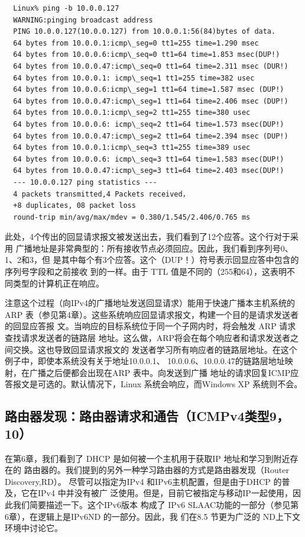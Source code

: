 \begin{verbatim}
  Linux% ping -b 10.0.0.127
  WARNING:pinging broadcast address
  PING 10.0.0.127(10.0.0.127) from 10.0.0.1:56(84)bytes of data.
  64 bytes from 10.0.0.1:icmp\_seg=0 tt1=255 time=1.290 msec
  64 bytes from 10.0.0.6:icmp\_seq=0 tt1=64 time=1.853 msec(DUP!)
  64 bytes from 10.0.0.47:icmp\_seq=0 tt1=64 time=2.311 msec (DUR!)
  64 bytes from 10.0.0.1: icmp\_seq=1 tt1=255 time=382 usec
  64 bytes from 10.0.0.6:icmp\_seg=1 tt1=64 time=1.587 msec (DUP!)
  64 bytes from 10.0.0.47:icmp\_seg=1 tt1=64 time=2.406 msec (DUP!)
  64 bytes from 10.0.0.1:icmp\_seg=2 tt1=255 time=380 usec
  64 bytes from 10.0.0.6: icmp\_seq=2 tt1=64 time=1.573 msec(DUP!)
  64 bytes from 10.0.0.47:icmp\_seg=2 tt1=64 time=2.394 msec (DUP!)
  64 bytes from 10.0.0.1:icmp\_seq=3 tt1=255 time=389 usec
  64 bytes from 10.0.0.6: icmp\_seq=3 tt1=64 time=1.583 msec(DUP!)
  64 bytes from 10.0.0.47:icmp\_seg=3 tt1=64 time=2.403 msec(DUP!)
  --- 10.0.0.127 ping statistics ---
  4 packets transmitted,4 Packets received，
  +8 duplicates, 08 packet loss
  round-trip min/avg/max/mdev = 0.380/1.545/2.406/0.765 ms
\end{verbatim}

此处，4个传出的回显请求报文被发送出去，我们看到了12个应答。这个行对于采用
广播地址是非常典型的：所有接收节点必须回应。因此，我们看到序列号0、1、2和3，但
是其中每个有3个应答。这个（DUP！）符号表示回显应答中包含的序列号字段和之前接收
到的一样。由于 TTL 值是不同的（255和64），这表明不同类型的计算机正在响应。

注意这个过程（向IPv4的广播地址发送回显请求）能用于快速广播本主机系统的 ARP
表（参见第4章）。这些系统响应回显请求报文，构建一个目的是请求发送者的回显应答报
文。当响应的目标系统位于同一个子网内时，将会触发 ARP 请求查找请求发送者的链路层
地址。这么做，ARP将会在每个响应者和请求发送者之间交换。这也导致回显请求报文的
发送者学习所有响应者的链路层地址。在这个例子中，即使本系统没有关于地址10.0.0.1、
10.0.0.6、10.0.0.47的链路层地址映射，在广播之后便都会出现在ARP 表中。向发送到广播
地址的请求回复ICMP应答报文是可选的。默认情况下，Linux 系统会响应，而Windows XP
系统则不会。

\subsection{路由器发现：路由器请求和通告（ICMPv4类型9，10）}
在第6章，我们看到了 DHCP 是如何被一个主机用于获取IP 地址和学习到附近存在的
路由器的。我们提到的另外一种学习路由器的方式是路由器发现（Router Discovery,RD）。
尽管可以指定为IPv4 和IPv6主机配置，但是由于DHCP 的普及，它在IPv4 中并没有被广
泛使用。但是，目前它被指定与移动IP一起使用，因此我们简要描述一下。这个IPv6版本
构成了 IPv6 SLAAC功能的一部分（参见第6章），在逻辑上是IPv6ND 的一部分。因此，我
们在8.5 节更为广泛的 ND上下文环境中讨论它。

